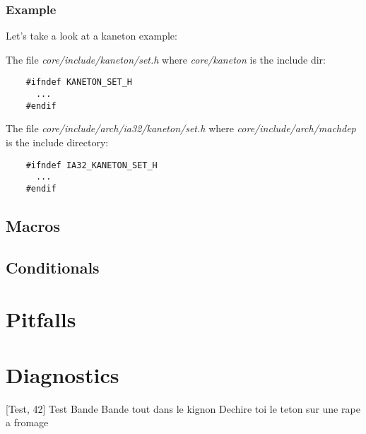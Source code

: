 \documentclass[9pt]{beamer}
\begin{document}

\begin{frame}[containsverbatim]
  \frametitle{Example}

  Let's take a look at a kaneton example:

  The file \textit{core/include/kaneton/set.h} where \textit{core/kaneton}
  is the include dir:

  \begin{verbatim}
    #ifndef KANETON_SET_H
      ...
    #endif
  \end{verbatim}

  The file \textit{core/include/arch/ia32/kaneton/set.h} where
  \textit{core/include/arch/machdep} is the include directory:

  \begin{verbatim}
    #ifndef IA32_KANETON_SET_H
      ...
    #endif
  \end{verbatim}
\end{frame}

\subsection{Macros}

\subsection{Conditionals}

\section{Pitfalls}

\section{Diagnostics}

%
%

\begin{thebibliography}{10}

  [Test, 42]
    Test Bande
    \newblock Bande tout dans le kignon
    \newblock Dechire toi le teton sur une rape a fromage

\end{thebibliography}
\end{document}

